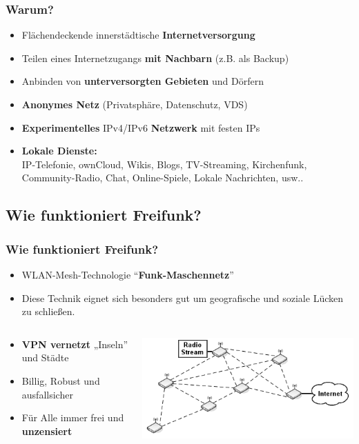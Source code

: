 \begin{frame}
\frametitle{Warum?}
	\begin{itemize}
		\item Flächendeckende innerstädtische \textbf{Internetversorgung}
		\item Teilen eines Internetzugangs \textbf{mit Nachbarn} (z.B. als Backup)
		\item Anbinden von \textbf{unterversorgten Gebieten} und Dörfern
		\item \textbf{Anonymes Netz} (Privatsphäre, Datenschutz, VDS)
		\item \textbf{Experimentelles }IPv4/IPv6 \textbf{Netzwerk }mit festen IPs
		\item \textbf{Lokale Dienste:} 
		\\ IP-Telefonie, ownCloud, Wikis, Blogs, TV-Streaming, Kirchenfunk, Community-Radio, Chat, Online-Spiele, Lokale Nachrichten, usw..
	\end{itemize}
\end{frame}


\subsection{Wie funktioniert Freifunk?}

\begin{frame}
\frametitle{Wie funktioniert Freifunk?}
	\begin{itemize}
		\item WLAN-Mesh-Technologie “\textbf{Funk-Maschennetz}”
		\item Diese Technik eignet sich besonders gut um geografische und soziale Lücken zu schließen.
	\end{itemize}
	\begin{columns}[c]   
		\begin{column}[T]{0.4\textwidth}     
			\begin{itemize}
				\item \textbf{VPN vernetzt} „Inseln” und Städte
				\item Billig, Robust und ausfallsicher
				\item Für Alle immer frei und \textbf{unzensiert}
			\end{itemize}
		\end{column} 
		\begin{column}[T]{0.5\textwidth}     
			\includegraphics[width=\textwidth]{images/mesh_uebersicht.png}   
		\end{column}
	\end{columns} 
\end{frame}


